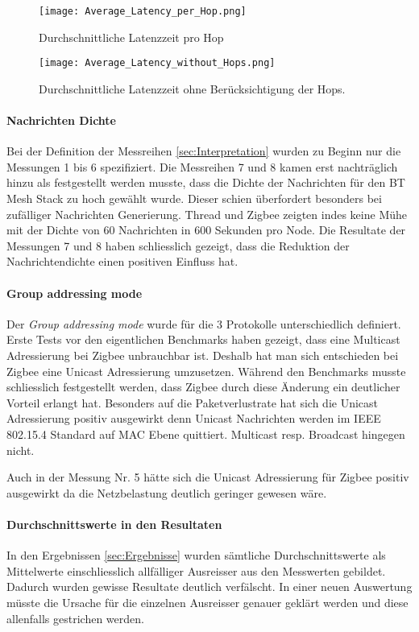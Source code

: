 \begin{figure}[!htbp]
	\centering
	\begin{minipage}[b]{0.49\textwidth}
		\centering
		\texttt{[image: Average\_Latency\_per\_Hop.png]}
		\caption{Durchschnittliche Latenzzeit pro Hop}
		\label{fig:DurchschnittlicheLatenzzeitValidierung}
	\end{minipage}
	\begin{minipage}[b]{0.49\textwidth}
		\centering
		\texttt{[image: Average\_Latency\_without\_Hops.png]}
		\caption{Durchschnittliche Latenzzeit ohne Berücksichtigung der Hops.}	\label{fig:DurchschnittlicheLatenzzeitohneHopsValidierung}
	\end{minipage}
\end{figure}

\newpage
\paragraph{Nachrichten Dichte}
Bei der Definition der Messreihen \ref{sec:Interpretation} wurden zu Beginn nur die Messungen 1 bis 6 spezifiziert.
Die Messreihen 7 und 8 kamen erst nachträglich hinzu als festgestellt werden musste, dass die Dichte der Nachrichten für den BT Mesh Stack zu hoch gewählt wurde.
Dieser schien überfordert besonders bei zufälliger Nachrichten Generierung.
Thread und Zigbee zeigten indes keine Mühe mit der Dichte von 60 Nachrichten in 600 Sekunden pro Node.
Die Resultate der Messungen 7 und 8 haben schliesslich gezeigt, dass die Reduktion der Nachrichtendichte einen positiven Einfluss hat.

\paragraph{Group addressing mode}
Der \textit{Group addressing mode} wurde für die 3 Protokolle unterschiedlich definiert.
Erste Tests vor den eigentlichen Benchmarks haben gezeigt, dass eine Multicast Adressierung bei Zigbee unbrauchbar ist.
Deshalb hat man sich entschieden bei Zigbee eine Unicast Adressierung umzusetzen.
Während den Benchmarks musste schliesslich festgestellt werden, dass Zigbee durch diese Änderung ein deutlicher Vorteil erlangt hat.
Besonders auf die Paketverlustrate hat sich die Unicast Adressierung positiv ausgewirkt denn Unicast Nachrichten werden im IEEE 802.15.4 Standard auf MAC Ebene quittiert.
Multicast resp. Broadcast hingegen nicht.

Auch in der Messung Nr. 5 hätte sich die Unicast Adressierung für Zigbee positiv ausgewirkt da die Netzbelastung deutlich geringer gewesen wäre.

\paragraph{Durchschnittswerte in den Resultaten}
In den Ergebnissen \ref{sec:Ergebnisse} wurden sämtliche Durchschnittswerte als Mittelwerte einschliesslich allfälliger Ausreisser aus den Messwerten gebildet.
Dadurch wurden gewisse Resultate deutlich verfälscht.
In einer neuen Auswertung müsste die Ursache für die einzelnen Ausreisser genauer geklärt werden und diese allenfalls gestrichen werden.